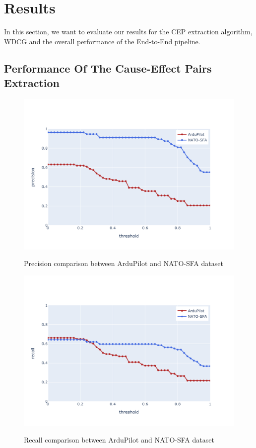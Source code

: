 \chapter{Results}\label{ch:results}
In this section, we want to evaluate our results for the \ac{CEP} extraction algorithm, \ac{WDCG} and the overall performance of the End-to-End pipeline.


\section{Performance Of The Cause-Effect Pairs Extraction}\label{sec:performance-measure}
\begin{figure}
    \begin{center}
        \includegraphics[scale=.65]{figures/results/precision}
        \caption{Precision comparison between ArduPilot and NATO-SFA dataset}\label{fig:precision}
        \includegraphics[scale=.65]{figures/results/recall}
        \caption{Recall comparison between ArduPilot and NATO-SFA dataset}\label{fig:recall}
    \end{center}
\end{figure}
